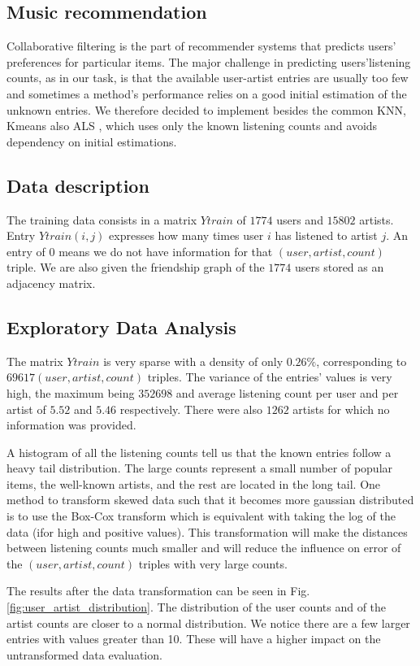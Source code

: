 \subsection{Music recommendation}
Collaborative filtering is the part of recommender systems that predicts users' preferences for particular items. The major challenge in predicting users'listening counts, as in our task, is that the available user-artist entries are usually too few and sometimes a method's performance relies on a good initial estimation of the unknown entries. 
We therefore decided to implement besides the common KNN, Kmeans also ALS \cite{Zhou:2008}, which uses only the known listening counts and avoids dependency on initial estimations.

\subsection{Data description}
The training data consists in a matrix $Ytrain$ of $1774$ users and $15802$ artists. Entry $Ytrain(i,j)$ expresses how many times user $i$ has listened to artist $j$. An entry of 0 means we do not have information for that $(user, artist, count)$ triple. We are also given the friendship graph of the $1774$ users stored as an adjacency matrix.

\subsection{Exploratory Data Analysis}

The matrix $Ytrain$ is very sparse with a density of only $0.26\%$, corresponding to $69617 (user, artist, count)$ triples. 
The variance of the entries' values is very high, the maximum  being $352698$ and average listening count per user and per artist of $5.52$ and $5.46$ respectively. There were also $1262$ artists for which no information was provided. \par \noindent A histogram of all the listening counts tell us that the known entries follow a heavy tail distribution. The large counts represent a small number of popular items, the well-known artists, and the rest are located in the long tail. One method to transform skewed data such that it becomes more gaussian distributed is to use the Box-Cox transform which is equivalent with taking the log of the data (ifor  high and positive values). This transformation will make the distances between listening counts much smaller and will reduce the influence on error of the $(user,artist,count)$ triples with very large counts.
\par The results after the data transformation can be seen in Fig. \ref{fig:user_artist_distribution}. The distribution of the user counts and of the artist counts are closer to a normal distribution. We notice there are a few larger entries with values greater than 10. These will have a higher impact on the untransformed data evaluation. 

